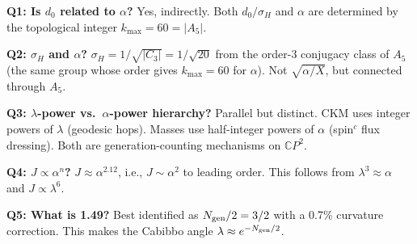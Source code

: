 \documentclass[11pt]{article}
\newcommand{\CP}{\mathbb{C}P}
\theoremstyle{remark}
\begin{document}
\begin{tcolorbox}[colback=blue!5!white, colframe=blue!50!black,
  title=Summary of $\alpha$--CKM Connections]

\textbf{Q1: Is $d_0$ related to $\alpha$?}
Yes, indirectly. Both $d_0/\sigma_H$ and $\alpha$ are determined by
the topological integer $k_{\max} = 60 = |A_5|$.

\textbf{Q2: $\sigma_H$ and $\alpha$?}
$\sigma_H = 1/\sqrt{|C_3|} = 1/\sqrt{20}$ from the order-3 conjugacy
class of $A_5$ (the same group whose order gives $k_{\max} = 60$
for $\alpha$). Not $\sqrt{\alpha/X}$, but connected through $A_5$.

\textbf{Q3: $\lambda$-power vs.\ $\alpha$-power hierarchy?}
Parallel but distinct. CKM uses integer powers of $\lambda$ (geodesic
hops). Masses use half-integer powers of $\alpha$ (spin$^c$ flux
dressing). Both are generation-counting mechanisms on $\CP^2$.

\textbf{Q4: $J \propto \alpha^n$?}
$J \approx \alpha^{2.12}$, i.e., $J \sim \alpha^2$ to leading order.
This follows from $\lambda^3 \approx \alpha$ and $J \propto \lambda^6$.

\textbf{Q5: What is 1.49?}
Best identified as $N_{\rm gen}/2 = 3/2$ with a 0.7\% curvature
correction. This makes the Cabibbo angle $\lambda \approx e^{-N_{\rm gen}/2}$.

\end{tcolorbox}
\end{document}

